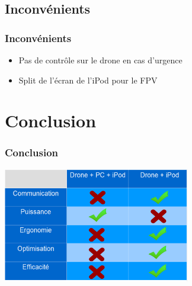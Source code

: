 \documentclass[11pt]{beamer}
\begin{document}
\subsection{Inconvénients}
\begin{frame}
\frametitle{Inconvénients}

\begin{itemize}
    \item Pas de contrôle sur le drone en cas d'urgence 
    
    \item Split de l'écran de l'iPod pour le FPV 
    
  \end{itemize}

\end{frame}

\section{Conclusion}
\begin{frame}
\frametitle{Conclusion}

\begin{center}
\includegraphics[height=5cm]{tableau.png}
\end{center}

\end{frame}
\end{document}
